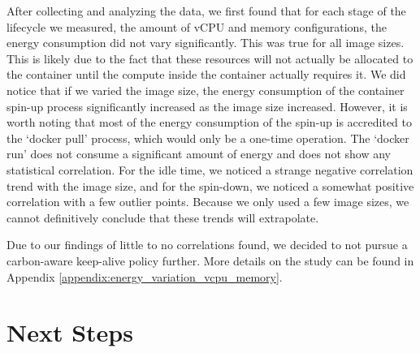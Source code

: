 \documentclass[times, 10pt,twocolumn]{article}
\begin{document}
After collecting and analyzing the data, we first found that for each stage of the lifecycle we measured, the amount of vCPU and memory configurations, the energy consumption did not vary significantly. This was true for all image sizes. This is likely due to the fact that these resources will not actually be allocated to the container until the compute inside the container actually requires it. We did notice that if we varied the image size, the energy consumption of the container spin-up process significantly increased as the image size increased. However, it is worth noting that most of the energy consumption of the spin-up is accredited to the `docker pull' process, which would only be a one-time operation. The `docker run' does not consume a significant amount of energy and does not show any statistical correlation. For the idle time, we noticed a strange negative correlation trend with the image size, and for the spin-down, we noticed a somewhat positive correlation with a few outlier points. Because we only used a few image sizes, we cannot definitively conclude that these trends will extrapolate.

Due to our findings of little to no correlations found, we decided to not pursue a carbon-aware keep-alive policy further. More details on the study can be found in Appendix \ref{appendix:energy_variation_vcpu_memory}.







\section{Next Steps}
\end{document}
